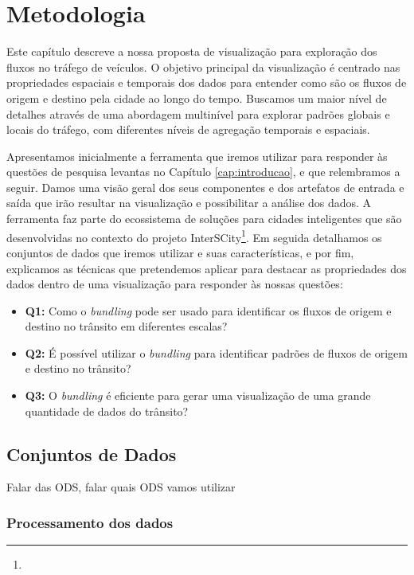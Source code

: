 \chapter{Metodologia}
\label{cap:metodologia}
 Este capítulo descreve a nossa proposta de visualização para exploração dos
fluxos no tráfego de veículos. O objetivo principal da visualização é centrado
nas propriedades espaciais e temporais dos dados para entender como são os
fluxos de origem e destino pela cidade ao longo do tempo. Buscamos um maior
nível de detalhes através de uma abordagem multinível para explorar padrões
globais e locais do tráfego, com diferentes níveis de agregação temporais e
espaciais.

 Apresentamos inicialmente a ferramenta que iremos utilizar para responder às
questões de pesquisa levantas no Capítulo \ref{cap:introducao}, e que
relembramos a seguir. Damos uma visão geral dos seus componentes e dos
artefatos de entrada e saída que irão resultar na visualização e possibilitar a
análise dos dados. A ferramenta faz parte do ecossistema de soluções para
cidades inteligentes que são desenvolvidas no contexto do projeto
InterSCity\footnote{}. Em seguida detalhamos os conjuntos
de dados que iremos utilizar e suas características, e por fim, explicamos as
técnicas que pretendemos aplicar para destacar as propriedades dos dados dentro
de uma visualização para responder às nossas questões:

\begin{itemize}
  \item \textbf{Q1:} Como o \emph{bundling} pode ser usado para identificar os
fluxos de origem e destino no trânsito em diferentes escalas?

  \item \textbf{Q2:} É possível utilizar o \emph{bundling}  para
identificar padrões de fluxos de origem e destino no trânsito?

  \item \textbf{Q3:} O \emph{bundling} é eficiente para gerar uma
visualização de uma grande quantidade de dados do trânsito?
\end{itemize}


\section{Conjuntos de Dados}

Falar das ODS, falar quais ODS vamos utilizar


\subsection{Processamento dos dados}


